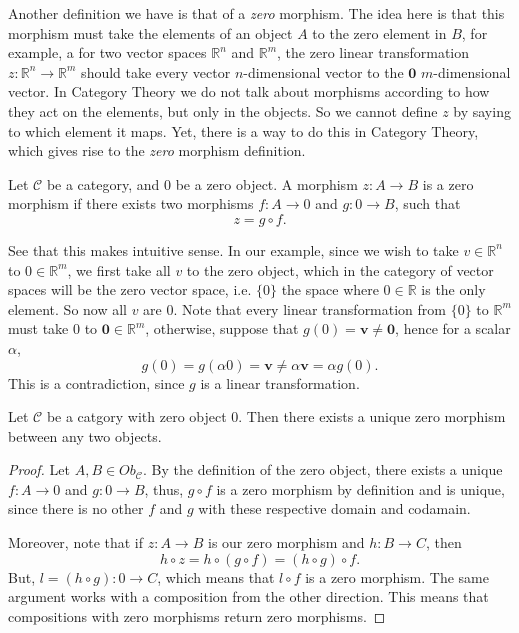 Another definition we have is that of a \textit{zero} morphism. The idea here
is that this morphism must take the elements of an object $A$ to the
zero element in $B$, for example, a for two vector spaces $\mathbb R^n$ and $\mathbb R^m$,
the zero linear transformation $z:\mathbb R^n \to \mathbb R^m$ should take every vector
$n$-dimensional vector to the $\mathbf{0}$ $m$-dimensional vector. In Category
Theory we do not talk about morphisms according to how they act on the elements, but
only in the objects. So we cannot define $z$ by saying to which element it maps.
Yet, there is a way to do this in Category Theory, which gives rise to the \textit{zero} morphism
definition.
\begin{definition}
  Let $\mathcal C$ be a category, and $0$ be a zero object.
  A morphism $z:A \to B$ is a zero morphism if there exists two morphisms
  $f:A\to 0$ and $g:0 \to B$, such that
  \begin{displaymath}
    z = g \circ f.  
  \end{displaymath}
\end{definition}
See that this makes intuitive sense. In our example, since we wish to take
$v \in \mathbb R^n$ to $0 \in \mathbb R^m$, we first take all $v$ to the zero object,
which in the category of vector spaces will be the zero vector space, i.e. $\{0\}$ the space
where $0 \in \mathbb R$ is the only element. So now all $v$ are $0$. Note that
every linear transformation from $\{0\}$ to $\mathbb R^m$ must take $0$ to $\mathbf{0} \in \mathbb R^m$,
otherwise, suppose that $g(0)=\mathbf{v} \neq \mathbf{0}$, hence for a scalar $\alpha$,
\begin{displaymath}
  g(0) = g(\alpha0) = \mathbf{v} \neq \alpha \mathbf{v} = \alpha g(0).
\end{displaymath}
This is a contradiction, since $g$ is a linear transformation.

\begin{theorem}
  Let $\mathcal C$ be a catgory with zero object $0$.
  Then there exists a unique zero morphism between any two objects.
\end{theorem}
\begin{proof}
  Let $A, B \in Ob_\mathcal C$.
  By the definition of the zero object, there exists a unique 
  $f:A \to 0$ and $g:0\to B$, thus, $g \circ f$ is a zero morphism
  by definition and is unique, since there is no other $f$ and $g$ with these respective
  domain and codamain.

  Moreover, note that if $z:A \to B$ is our zero morphism and $h:B \to C$, then
  \begin{displaymath}
    h \circ z = h \circ (g \circ f) = (h \circ g) \circ f.
  \end{displaymath}
  But, $l =(h \circ g):0 \to C$, which means that $l \circ f$ is a zero morphism.
  The same argument works with a composition from the other direction. This means
  that compositions with zero morphisms return zero morphisms.
\end{proof}


